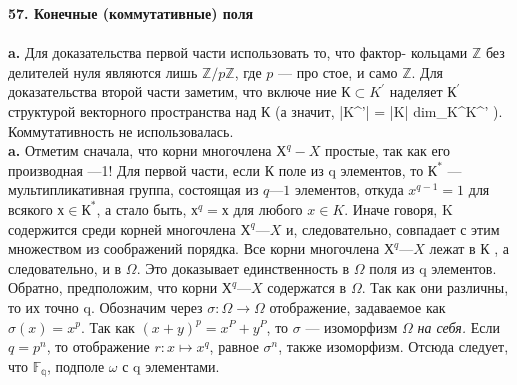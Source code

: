 \documentclass{../../template/mai_book}
\begin{document}
{{\newpage

\noindent\textbf{57. Конечные (коммутативные) поля}\\
\\
\hspace*{15pt}\textbf{a.} Для доказательства первой части использовать то, что фактор-\linebreak
кольцами $\mathbb{Z}$ без делителей нуля являются лишь $\mathbb{Z}/p\mathbb{Z}$, где $p$ --- про­\linebreak
стое, и само $\mathbb{Z}$. Для доказательства второй части заметим, что включе­\linebreak
ние $К \subset K^{'}$ наделяет $К^{'}$ структурой векторного пространства над $К$\linebreak
(а значит, |K^{'}| = |K| dim_K^{K^{'}} ). Коммутативность не использовалась.\\

\hspace*{15pt}\textbf{a.} Отметим сначала, что корни многочлена $Х^{q} - X$ простые, так\linebreak
как его производная —1! Для первой части, если К поле из q элементов,\linebreak
то $К^{*}$ --- мультипликативная группа, состоящая из $q — 1$ элементов,\linebreak
откуда $x^{q-1} = 1$ для всякого $х \in К^{*}$, а стало быть, $х^{q} = х$ для любого\linebreak
$x \in K$. Иначе говоря, K содержится среди корней многочлена $Х^{q} — X$ и,\linebreak
следовательно, совпадает с этим множеством из соображений порядка.\linebreak
Все корни многочлена $Х^{q} — X$ лежат в К , а следовательно, и в $\Omega$. Это\linebreak
доказывает единственность в $\Omega$ поля из q элементов.\\
\hspace*{0pt} Обратно, предположим, что корни $Х^{q} — X$ содержатся в $\Omega$. Так как\linebreak
они различны, то их точно q. Обозначим через $\sigma : \Omega \rightarrow \Omega$ отображение,\linebreak
задаваемое как $\sigma(x) = x^{p}$. Так как $(x + y)^{p} = x^{P} + y^{P}$, то $\sigma$ --- изоморфизм\linebreak
$\Omega$ \textit{на себя.} Если $q = p^{n}$, то отображение $r : x \mapsto x^{q}$, равное $\sigma^{n}$, также\linebreak
изоморфизм. Отсюда следует, что $\mathbb{F_q}$, подполе $\omega$ с q элементами.\\

}}
\end{document}

